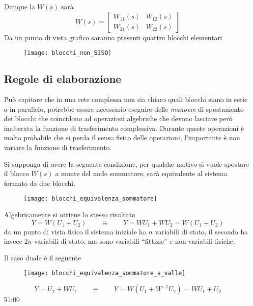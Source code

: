 Dunque la $W(s)$ sarà
$$
W(s) = \begin{bmatrix}
W_{11}(s) & W_{12}(s) \\
W_{21}(s) & W_{22}(s)
\end{bmatrix}
$$
Da un punto di vista grafico saranno presenti quattro blocchi elementari
\begin{figure}[h]
\centering
\texttt{[image: blocchi\_non\_SISO]}
\end{figure}

\subsection{Regole di elaborazione}
Può capitare che in una rete complessa non sia chiaro quali blocchi siano in
serie o in parallelo, potrebbe essere necessario eseguire delle
\textit{manovre} di spostamento dei blocchi che coincidono ad operazioni
algebriche che devono lasciare però inalterata la funzione di trasferimento
complessiva.
Durante queste operazioni è molto probabile che si perda il senso fisico delle
operazioni, l'importante è non variare la funzione di trasferimento.

Si supponga di avere la seguente condizione, per qualche motivo si vuole
spostare il blocco $W(s)$ a monte del nodo sommatore, sarà equivalente al
sistema formato da due blocchi.
\begin{figure}[h]
\centering
\texttt{[image: blocchi\_equivalenza\_sommatore]}
\end{figure}
Algebricamente si ottiene lo stesso risultato
$$
Y = W(U_1+U_2) \qquad \equiv \qquad Y= WU_1 + WU_2 = W(U_1+U_2)
$$
da un punto di vista fisico il sistema iniziale ha $n$ variabili di stato, il
secondo ha invece $2n$ variabili di stato, ma sono variabili ``fittizie'' e non
variabili fisiche.

Il caso duale è il seguente
\begin{figure}[h]
\centering
\texttt{[image: blocchi\_equivalenza\_sommatore\_a\_valle]}
\end{figure}
$$
Y = U_2 + WU_1 \qquad \equiv \qquad
Y = W(U_1 + W^{-1}U_2) = WU_1 + U_2
$$
51:00
